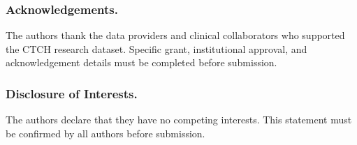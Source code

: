\documentclass[runningheads]{llncs}
\begin{document}
\subsubsection{Acknowledgements.}
The authors thank the data providers and clinical collaborators who supported the CTCH research dataset. Specific grant, institutional approval, and acknowledgement details must be completed before submission.

\subsubsection{Disclosure of Interests.}
The authors declare that they have no competing interests. This statement must be confirmed by all authors before submission.



\end{document}

